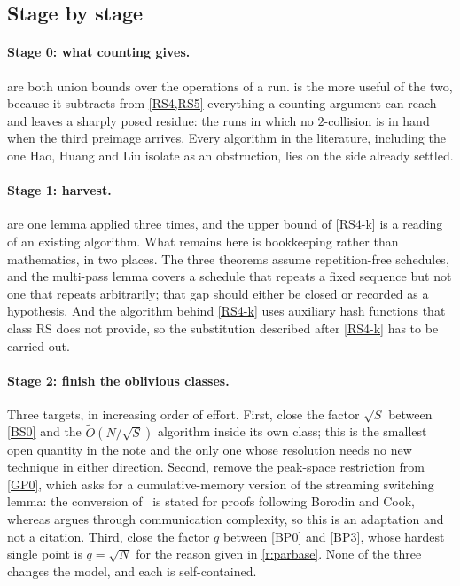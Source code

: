 \documentclass[11pt]{article}
\theoremstyle{plain}
\theoremstyle{definition}
\newcommand{\cls}[1]{\textsf{#1}}   %
\begin{document}
\subsection{Stage by stage}

\paragraph{Stage 0: what counting gives.}
 are both union bounds over the operations of a run.
 is the more useful of the two, because it subtracts from
\cref{RS4,RS5} everything a counting argument can reach and leaves a
sharply posed residue: the runs in which no $2$-collision is in hand when
the third preimage arrives.  Every algorithm in the literature, including
the one Hao, Huang and Liu isolate as an obstruction, lies on the side
already settled.

\paragraph{Stage 1: harvest.}
 are one lemma applied three times, and the upper bound
of \cref{RS4-k} is a reading of an existing algorithm.  What remains here
is bookkeeping rather than mathematics, in two places.  The three theorems
assume repetition-free schedules, and the multi-pass lemma covers a
schedule that repeats a fixed sequence but not one that repeats
arbitrarily; that gap should either be closed or recorded as a hypothesis.
And the algorithm behind \cref{RS4-k} uses auxiliary hash functions that
class \cls{RS} does not provide, so the substitution described after
\cref{RS4-k} has to be carried out.

\paragraph{Stage 2: finish the oblivious classes.}
Three targets, in increasing order of effort.  First, close the factor
$\sqrt S$ between \cref{BS0} and the $\tilde O(N/\sqrt S)$ algorithm inside
its own class; this is the smallest open quantity in the note and the only
one whose resolution needs no new technique in either direction.  Second,
remove the peak-space restriction from \cref{GP0}, which asks for a
cumulative-memory version of the streaming switching lemma: the conversion
of~\cite{BK23} is stated for proofs following Borodin and Cook, whereas
\cite{Din20b} argues through communication complexity, so this is an
adaptation and not a citation.  Third, close the factor $q$ between
\cref{BP0} and \cref{BP3}, whose hardest single point is $q = \sqrt N$ for
the reason given in \cref{r:parbase}.  None of the three changes the model,
and each is self-contained.
\end{document}
